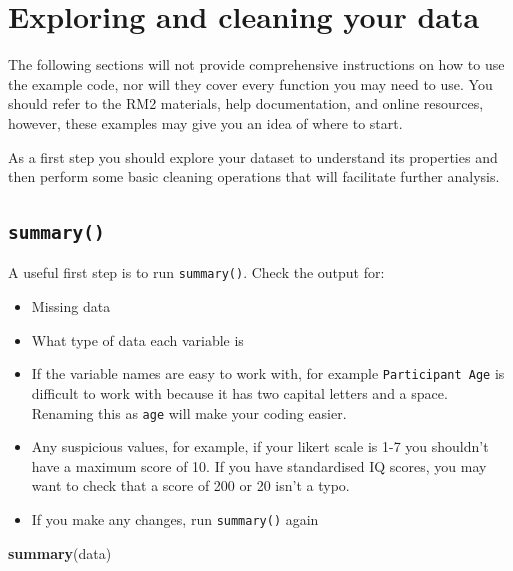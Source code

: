 \documentclass[]{book}
\newenvironment{Shaded}{\begin{snugshade}}{\end{snugshade}}
\newcommand{\KeywordTok}[1]{\textcolor[rgb]{0.13,0.29,0.53}{\textbf{#1}}}
\newcommand{\NormalTok}[1]{#1}
\providecommand{\tightlist}{%
  \setlength{\itemsep}{0pt}\setlength{\parskip}{0pt}}
\begin{document}
\hypertarget{exploring-and-cleaning-your-data}{%
\section{Exploring and cleaning your data}\label{exploring-and-cleaning-your-data}}

The following sections will not provide comprehensive instructions on how to use the example code, nor will they cover every function you may need to use. You should refer to the RM2 materials, help documentation, and online resources, however, these examples may give you an idea of where to start.

As a first step you should explore your dataset to understand its properties and then perform some basic cleaning operations that will facilitate further analysis.

\hypertarget{summary}{%
\subsection{\texorpdfstring{\texttt{summary()}}{summary()}}\label{summary}}

A useful first step is to run \texttt{summary()}. Check the output for:

\begin{itemize}
\tightlist
\item
  Missing data\\
\item
  What type of data each variable is\\
\item
  If the variable names are easy to work with, for example \texttt{Participant\ Age} is difficult to work with because it has two capital letters and a space. Renaming this as \texttt{age} will make your coding easier.\\
\item
  Any suspicious values, for example, if your likert scale is 1-7 you shouldn't have a maximum score of 10. If you have standardised IQ scores, you may want to check that a score of 200 or 20 isn't a typo.\\
\item
  If you make any changes, run \texttt{summary()} again
\end{itemize}

\begin{Shaded}
\begin{Highlighting}[]
\KeywordTok{summary}\NormalTok{(data)}
\end{Highlighting}
\end{Shaded}
\end{document}
